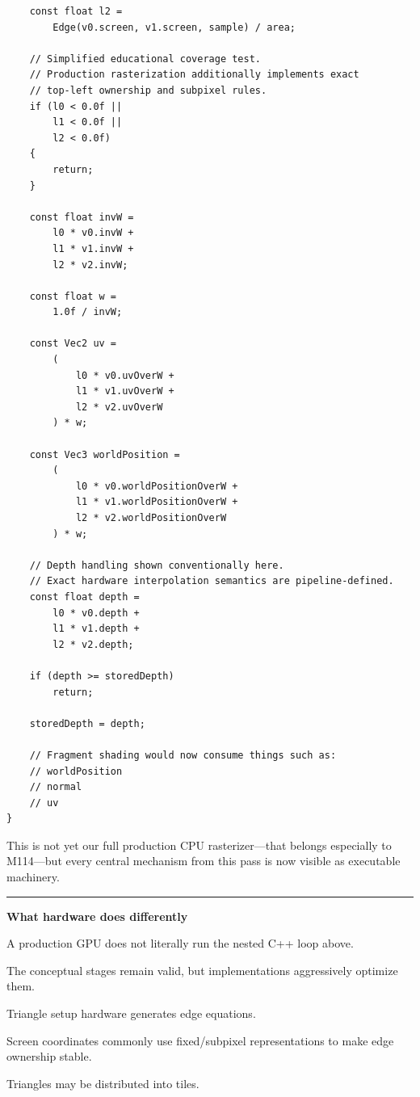 \begin{verbatim}
    const float l2 =
        Edge(v0.screen, v1.screen, sample) / area;

    // Simplified educational coverage test.
    // Production rasterization additionally implements exact
    // top-left ownership and subpixel rules.
    if (l0 < 0.0f ||
        l1 < 0.0f ||
        l2 < 0.0f)
    {
        return;
    }

    const float invW =
        l0 * v0.invW +
        l1 * v1.invW +
        l2 * v2.invW;

    const float w =
        1.0f / invW;

    const Vec2 uv =
        (
            l0 * v0.uvOverW +
            l1 * v1.uvOverW +
            l2 * v2.uvOverW
        ) * w;

    const Vec3 worldPosition =
        (
            l0 * v0.worldPositionOverW +
            l1 * v1.worldPositionOverW +
            l2 * v2.worldPositionOverW
        ) * w;

    // Depth handling shown conventionally here.
    // Exact hardware interpolation semantics are pipeline-defined.
    const float depth =
        l0 * v0.depth +
        l1 * v1.depth +
        l2 * v2.depth;

    if (depth >= storedDepth)
        return;

    storedDepth = depth;

    // Fragment shading would now consume things such as:
    // worldPosition
    // normal
    // uv
}
\end{verbatim}

This is not yet our full production CPU rasterizer---that belongs especially to M114---but every central mechanism from this pass is now visible as executable machinery.

\begin{center}\rule{0.5\linewidth}{0.5pt}\end{center}

\textbf{What hardware does differently}

A production GPU does not literally run the nested C++ loop above.

The conceptual stages remain valid, but implementations aggressively optimize them.

Triangle setup hardware generates edge equations.

Screen coordinates commonly use fixed/subpixel representations to make edge ownership stable.

Triangles may be distributed into tiles.

